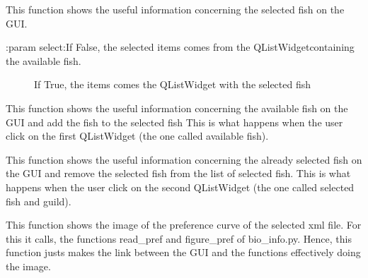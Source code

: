 \documentclass[letterpaper,10pt,english]{sphinxmanual}
\begin{document}
\begin{fulllineitems}
\begin{fulllineitems}
\end{fulllineitems}


\begin{fulllineitems}
\label{\detokenize{index:src_GUI.bio_info_GUI.BioInfo.show_info_fish}}
This function shows the useful information concerning the selected fish on the GUI.
\begin{description}
\item[{:param select:If False, the selected items comes from the QListWidgetcontaining the available fish.}] \leavevmode
If True, the items comes the QListWidget with the selected fish

\end{description}

\end{fulllineitems}


\begin{fulllineitems}
\label{\detokenize{index:src_GUI.bio_info_GUI.BioInfo.show_info_fish_avai}}
This function shows the useful information concerning the available fish on the GUI and
add the fish to  the selected fish This is what happens when the user click on the
first QListWidget (the one called available fish).

\end{fulllineitems}


\begin{fulllineitems}
\label{\detokenize{index:src_GUI.bio_info_GUI.BioInfo.show_info_fish_sel}}
This function shows the useful information concerning the already selected fish on the GUI and
remove the selected fish from the list of selected fish. This is what happens when the user click on the
second QListWidget (the one called selected fish and guild).

\end{fulllineitems}


\begin{fulllineitems}
\label{\detokenize{index:src_GUI.bio_info_GUI.BioInfo.show_pref}}
This function shows the image of the preference curve of the selected xml file. For this it calls, the functions
read\_pref and figure\_pref of bio\_info.py. Hence, this function justs makes the link between the GUI and
the functions effectively doing the image.


\end{fulllineitems}
\end{fulllineitems}
\end{document}
